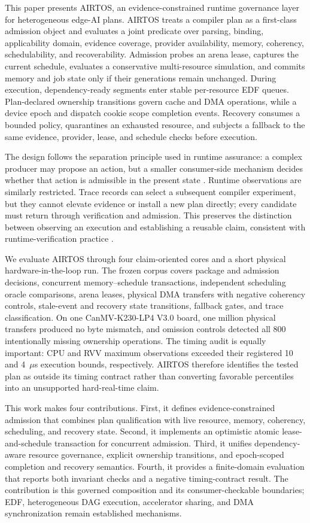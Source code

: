 \documentclass[lettersize,journal]{IEEEtran}
\begin{document}
This paper presents AIRTOS, an evidence-constrained runtime governance layer
for heterogeneous edge-AI plans. AIRTOS treats a compiler plan as a first-class
admission object and evaluates a joint predicate over parsing, binding,
applicability domain, evidence coverage, provider availability, memory,
coherency, schedulability, and recoverability. Admission probes an arena lease,
captures the current schedule, evaluates a conservative multi-resource
simulation, and commits memory and job state only if their generations remain
unchanged. During execution, dependency-ready segments enter stable
per-resource EDF queues. Plan-declared ownership transitions govern cache and
DMA operations, while a device epoch and dispatch cookie scope completion
events. Recovery consumes a bounded policy, quarantines an exhausted resource,
and subjects a fallback to the same evidence, provider, lease, and schedule
checks before execution.

The design follows the separation principle used in runtime assurance: a
complex producer may propose an action, but a smaller consumer-side mechanism
decides whether that action is admissible in the present state
\cite{seto1998simplex,hobbs2023runtime}. Runtime observations are similarly
restricted. Trace records can select a subsequent compiler experiment, but
they cannot elevate evidence or install a new plan directly; every candidate
must return through verification and admission. This preserves the distinction
between observing an execution and establishing a reusable claim, consistent
with runtime-verification practice \cite{leucker2009brief}.

We evaluate AIRTOS through four claim-oriented cores and a short physical
hardware-in-the-loop run. The frozen corpus covers package and admission
decisions, concurrent memory--schedule transactions, independent scheduling
oracle comparisons, arena leases, physical DMA transfers with negative
coherency controls, stale-event and recovery state transitions, fallback
gates, and trace classification. On one CanMV-K230-LP4 V3.0 board, one million
physical transfers produced no byte mismatch, and omission controls detected
all 800 intentionally missing ownership operations. The timing audit is
equally important: CPU and RVV maximum observations exceeded their registered
10 and 4~$\mu$s execution bounds, respectively. AIRTOS therefore identifies
the tested plan as outside its timing contract rather than converting favorable
percentiles into an unsupported hard-real-time claim.

This work makes four contributions. First, it defines evidence-constrained
admission that combines plan qualification with live resource, memory,
coherency, scheduling, and recovery state. Second, it implements an optimistic
atomic lease-and-schedule transaction for concurrent admission. Third, it
unifies dependency-aware resource governance, explicit ownership transitions,
and epoch-scoped completion and recovery semantics. Fourth, it provides a
finite-domain evaluation that reports both invariant checks and a negative
timing-contract result. The contribution is this governed composition and its
consumer-checkable boundaries; EDF, heterogeneous DAG execution, accelerator
sharing, and DMA synchronization remain established mechanisms.
\end{document}
